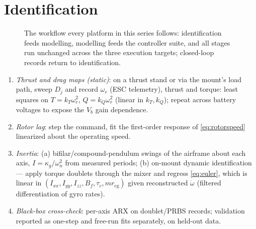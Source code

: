 \documentclass[conference]{IEEEtran}
\begin{document}
\section{Identification}

\begin{figure}[!t]
\centering
{}
\caption{The workflow every platform in this series follows: identification feeds modelling, modelling feeds the controller suite, and all stages run unchanged across the three execution targets; closed-loop records return to identification.}
\label{fig:workflow}
\end{figure}
\begin{enumerate}[label=E\arabic*)]
\item \emph{Thrust and drag maps (static)}: on a thrust stand or via the mount's load path, sweep $D_j$ and record $\omega_r$ (ESC telemetry), thrust and torque: least squares on $T = k_T\omega_r^2$, $Q = k_Q\omega_r^2$ (linear in $k_T,k_Q$); repeat across battery voltages to expose the $V_b$ gain dependence.
\item \emph{Rotor lag}: step the command, fit the first-order response of \eqref{eq:rotorspeed} linearized about the operating speed.
\item \emph{Inertia}: (a) bifilar/compound-pendulum swings of the airframe about each axis, $I = \kappa_g/\omega_n^2$ from measured periods; (b) on-mount dynamic identification --- apply torque doublets through the mixer and regress \eqref{eq:euler}, which is linear in $(I_{xx},I_{yy},I_{zz}, B_f, \tau_c, m r_{\mathrm{cg}})$ given reconstructed $\dot\omega$ (filtered differentiation of gyro rates).
\item \emph{Black-box cross-check}: per-axis ARX on doublet/PRBS records; validation reported as one-step and free-run fits separately, on held-out data.
\end{enumerate}
\end{document}

